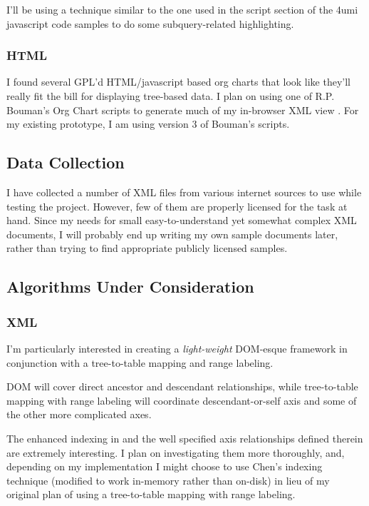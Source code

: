 \documentclass{acm_proc_article-sp}
\begin{document}
I'll be using a technique similar to the one used in the script section of the 4umi javascript code samples\cite{4umi} to do some subquery-related highlighting.

\subsubsection{HTML}
I found several GPL'd HTML/javascript based org charts that look like they'll really fit the bill for displaying tree-based data.  I plan on using one of R.P. Bouman's Org Chart scripts to generate much of my in-browser XML view \cite{org02, org03}.  For my existing prototype, I am using version 3
of Bouman's scripts.

\subsection{Data Collection}
I have collected a number of XML files from various internet sources\cite{xml1,xml2,xml3} to use while testing the project.  However, few of them are properly licensed for the task at hand.  Since my needs for small easy-to-understand yet somewhat complex XML documents, I will probably end up writing my own sample documents later, rather than trying to find appropriate publicly licensed samples.




\subsection{Algorithms Under Consideration}

\subsubsection{XML}
I'm particularly interested in creating a \emph{light-weight} DOM-esque framework in conjunction with a tree-to-table mapping and range labeling.

DOM will cover direct ancestor and descendant relationships, while tree-to-table mapping with range labeling will coordinate descendant-or-self axis and some of the other more complicated axes.

The enhanced indexing in \cite{chen:indexing} and the well specified axis relationships defined therein are extremely interesting.  I plan on investigating them more thoroughly, and, depending on my implementation I might choose to use Chen's indexing technique (modified to work in-memory rather than on-disk)  in lieu of my original plan of using a tree-to-table mapping with range labeling.
\end{document}
